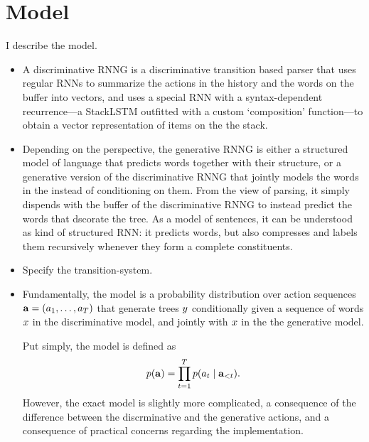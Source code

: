 % 

\section{Model}
I describe the model.
\begin{itemize}
  \item A discriminative RNNG is a discriminative transition based parser that uses regular RNNs to summarize the actions in the history and the words on the buffer into vectors, and uses a special RNN with a syntax-dependent recurrence---a StackLSTM \citep{Ballesteros+2017:StackLSTM} outfitted with a custom `composition' function---to obtain a vector representation of items on the the stack.
  \item Depending on the perspective, the generative RNNG is either a structured model of language that predicts words together with their structure, or a generative version of the discriminative RNNG that jointly models the words in the instead of conditioning on them. From the view of parsing, it simply dispends with the buffer of the discriminative RNNG to instead predict the words that dscorate the tree. As a model of sentences, it can be understood as kind of structured RNN: it predicts words, but also compresses and labels them recursively whenever they form a complete constituents.
  \item Specify the transition-system.
  \item Fundamentally, the model is a probability distribution over action sequences $\mathbf{a} = ( a_1, \dots, a_T )$ that generate trees $y$ conditionally given a sequence of words $x$ in the discriminative model, and jointly with $x$ in the the generative model.

  Put simply, the model is defined as
  \begin{equation}
    \label{eq:naive-rnng-model}
    p(\mathbf{a}) = \prod_{t=1}^T p(a_t \mid \mathbf{a}_{<t}).
  \end{equation}
  However, the exact model is slightly more complicated, a consequence of the difference between the discrminative and the generative actions, and a consequence of practical concerns regarding the implementation.


\end{itemize}
